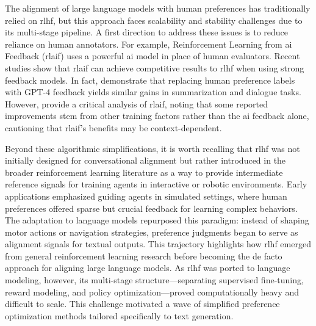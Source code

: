 The alignment of large language models with human preferences has traditionally relied on \gls{rlhf}, but this approach faces scalability and stability challenges due to its multi-stage pipeline. A first direction to address these issues is to reduce reliance on human annotators. For example, Reinforcement Learning from \gls{ai} Feedback (\gls{rlaif}) uses a powerful \gls{ai} model in place of human evaluators. Recent studies show that \gls{rlaif} can achieve competitive results to \gls{rlhf} when using strong feedback models. In fact, \citet{lee2023rlaif} demonstrate that replacing human preference labels with GPT-4 feedback yields similar gains in summarization and dialogue tasks. However, \citet{archit2024criticalevaluation} provide a critical analysis of \gls{rlaif}, noting that some reported improvements stem from other training factors rather than the \gls{ai} feedback alone, cautioning that \gls{rlaif}’s benefits may be context-dependent.

Beyond these algorithmic simplifications, it is worth recalling that \gls{rlhf} was not initially designed for conversational alignment but rather introduced in the broader reinforcement learning literature as a way to provide intermediate reference signals for training agents in interactive or robotic environments. Early applications emphasized guiding agents in simulated settings, where human preferences offered sparse but crucial feedback for learning complex behaviors. The adaptation to language models repurposed this paradigm: instead of shaping motor actions or navigation strategies, preference judgments began to serve as alignment signals for textual outputs. This trajectory highlights how \gls{rlhf} emerged from general reinforcement learning research before becoming the de facto approach for aligning large language models. As \gls{rlhf} was ported to language modeling, however, its multi-stage structure—separating supervised fine-tuning, reward modeling, and policy optimization—proved computationally heavy and difficult to scale. This challenge motivated a wave of simplified preference optimization methods tailored specifically to text generation.

